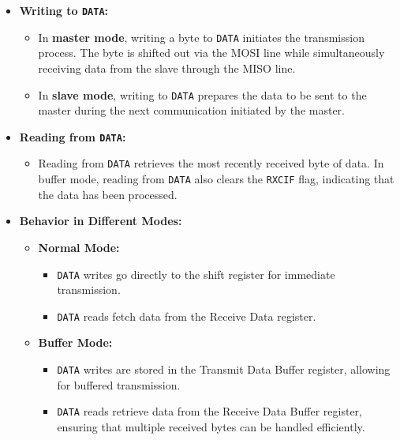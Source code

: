 \documentclass{article}
\begin{document}
\begin{itemize}
    \item \textbf{Writing to \texttt{DATA}:}
    \begin{itemize}
        \item In \textbf{master mode}, writing a byte to \texttt{DATA} initiates the transmission process. The byte is shifted out via the MOSI line while simultaneously receiving data from the slave through the MISO line.
        \item In \textbf{slave mode}, writing to \texttt{DATA} prepares the data to be sent to the master during the next communication initiated by the master.
    \end{itemize}
    
    \item \textbf{Reading from \texttt{DATA}:}
    \begin{itemize}
        \item Reading from \texttt{DATA} retrieves the most recently received byte of data. In buffer mode, reading from \texttt{DATA} also clears the \texttt{RXCIF} flag, indicating that the data has been processed.
    \end{itemize}
    
    \item \textbf{Behavior in Different Modes:}
    \begin{itemize}
        \item \textbf{Normal Mode:}
        \begin{itemize}
            \item \texttt{DATA} writes go directly to the shift register for immediate transmission.
            \item \texttt{DATA} reads fetch data from the Receive Data register.
        \end{itemize}
        \item \textbf{Buffer Mode:}
        \begin{itemize}
            \item \texttt{DATA} writes are stored in the Transmit Data Buffer register, allowing for buffered transmission.
            \item \texttt{DATA} reads retrieve data from the Receive Data Buffer register, ensuring that multiple received bytes can be handled efficiently.
        \end{itemize}
    \end{itemize}
\end{itemize}
\end{document}

